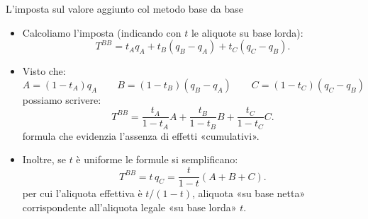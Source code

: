 \documentclass[11pt,italian]{beamer}
\begin{document}
\begin{frame}{L'imposta sul valore aggiunto col metodo base da base}
\begin{itemize}
\item Calcoliamo l'imposta (indicando con $t$ le aliquote su base lorda):
\begin{equation*}
T^{BB} = t_Aq_A + t_B(q_B-q_A) + t_C(q_C-q_B).
\end{equation*}
\item Visto che:
\begin{equation*}
A=(1-t_A)q_A\qquad B=(1-t_B)(q_B-q_A)\qquad C=(1-t_C)(q_C-q_B)
\end{equation*}
possiamo scrivere:
\begin{equation*}
  T^{BB} = \frac{t_A}{1-t_A}A + \frac{t_B}{1-t_B}B +\frac{t_C}{1-t_C}C.
\end{equation*}
formula che evidenzia l'assenza di effetti «cumulativi».
\item Inoltre, se $t$ è uniforme le formule si semplificano:
\begin{equation*}
  T^{BB} = t\,q_C = \frac{t}{1-t}(A + B+ C).
\end{equation*}
per cui l'aliquota effettiva è $t/(1-t)$, aliquota «su base netta»
corrispondente all'aliquota legale «su base lorda» $t$.
\end{itemize}
\end{frame}
\end{document}
